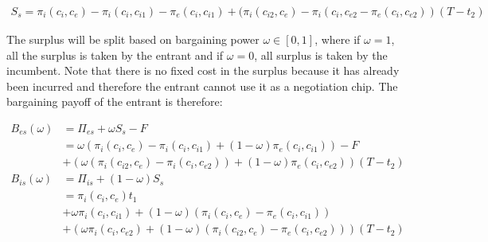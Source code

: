 
\begin{align*}
S_s= \pi_i(c_i,c_{e})-\pi_i(c_i,c_{i1})-\pi_e(c_i,c_{i1})+(\pi_i(c_{i2},c_e)-\pi_i(c_{i},c_{e2}-\pi_e(c_{i},c_{e2}))(T-t_2) 
\end{align*}

The surplus will be split based on bargaining power $\omega \in [0,1]$, where if $\omega = 1$, all the surplus is taken by the entrant and if $\omega = 0$, all surplus is taken by the incumbent. Note that there is no fixed cost in the surplus because it has already been incurred and therefore the entrant cannot use it as a negotiation chip. The bargaining payoff of the entrant is therefore:


\begin{align*}
B_{es}(\omega) &= \Pi_{es}+ \omega S_s -F \\
&=\omega(\pi_i(c_i,c_{e})-\pi_i(c_i,c_{i1})+(1-\omega)\pi_e(c_i,c_{i1}))-F \\
&+(\omega(\pi_i(c_{i2},c_e)- \pi_i(c_{i},c_{e2}))+(1-\omega)\pi_e(c_{i},c_{e2}))(T-t_2) \\
B_{is}(\omega) &= \Pi_{is}+(1-\omega)S_s \\
& =\pi_i(c_i,c_{e})t_1 \\
&+\omega \pi_i(c_i,c_{i1})+(1-\omega)(\pi_i(c_i,c_{e})-\pi_e(c_i,c_{i1}))
\\&+(\omega \pi_i(c_i,c_{e2})+(1-\omega)(\pi_i(c_{i2},c_e)-\pi_e(c_{i},c_{e2})))(T-t_2)
\end{align*}

